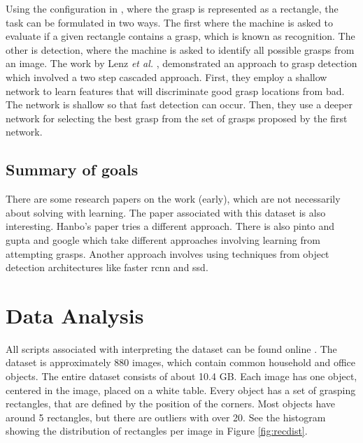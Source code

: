 \documentclass{article}
\begin{document}
Using the configuration in \cite{jiang11}, where the grasp is represented as
a rectangle, the task can be formulated in two ways.
The first where the machine is asked to evaluate if a given rectangle contains
a grasp, which is known as recognition. The other is detection, where the
machine is asked to identify all possible grasps from an image. The work by
Lenz \textit{et al.} \cite{lenz15}, demonstrated an approach to grasp
detection which involved a two step cascaded approach. First, they employ
a shallow network to learn features that will discriminate good grasp locations
from bad. The network is shallow so that fast detection can occur. Then, they
use a deeper network for selecting the best grasp from the set of grasps
proposed by the first network.

\subsection{Summary of goals}
There are some research papers on the work (early), which are not necessarily
about solving with learning.
The paper associated with
this dataset is also interesting. Hanbo's paper tries a different approach.
There is also pinto and gupta and google which take different approaches
involving learning from attempting grasps. Another approach involves using
techniques from object detection architectures like faster rcnn and ssd.


\section{Data Analysis}
All scripts associated with interpreting the dataset can be found online
\cite{ghrepo}. The dataset is approximately 880 images, which contain common
household and office objects. The entire dataset consists of about 10.4 GB.
Each image has one object, centered in the image, placed on a white table.
Every object has a set of grasping rectangles, that are defined by the position
of the corners. Most objects have around 5 rectangles, but there are outliers
with over 20. See the histogram showing the distribution of rectangles per image
in Figure \ref{fig:recdist}.
\end{document}
